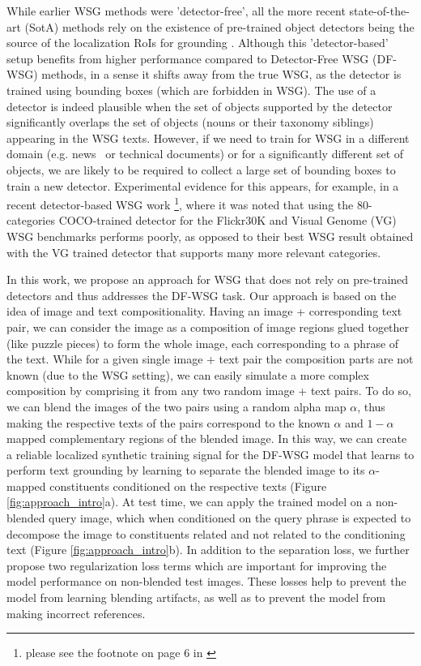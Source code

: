 \documentclass[10pt,twocolumn,letterpaper]{article}
\def\ourstask{DF-WSG}
\def\ourstaskfull{Detector-Free WSG }
\begin{document}
While earlier WSG methods \cite{akbari2019multi, javed2018learning, xiao2017weakly, zhang2018top} were 'detector-free', all the more recent state-of-the-art (SotA) methods rely on the existence of pre-trained object detectors being the source of the localization RoIs for grounding \cite{datta2019align2ground,gupta2020contrastive,wang2019phrase,chen2020counterfactual,chen2020uniter,lu202012}. Although this 'detector-based' setup benefits from higher performance compared to \ourstaskfull (\ourstask) methods, in a sense it shifts away from the true WSG, as the detector is trained using bounding boxes (which are forbidden in WSG). The use of a detector is indeed plausible when the set of objects supported by the detector significantly overlaps the set of objects (nouns or their taxonomy siblings) appearing in the WSG texts. However, if we need to train for WSG in a different domain (e.g. news~\cite{liu2020visualnews} or technical documents) or for a significantly different set of objects, we are likely to be required to collect a large set of bounding boxes to train a new detector. Experimental evidence for this appears, for example, in a recent detector-based WSG work \cite{datta2019align2ground}\footnote{please see the footnote on page 6 in \cite{datta2019align2ground}}, where it was noted that using the $80$-categories COCO-trained detector for the Flickr30K and Visual Genome (VG) WSG benchmarks performs poorly, as opposed to their best WSG result obtained with the VG trained detector that supports many more relevant categories. 

In this work, we propose an approach for WSG that does not rely on pre-trained detectors and thus addresses the \ourstask{} task. Our approach is based on the idea of image and text compositionality. Having an image + corresponding text pair, we can consider the image as a composition of image regions glued together (like puzzle pieces) to form the whole image, each corresponding to a phrase of the text.
While for a given single image + text pair the composition parts are not known (due to the WSG setting), we can easily simulate a more complex composition by comprising it from any two random image + text pairs. To do so, we can blend the images of the two pairs using a random alpha map $\alpha$, thus making the respective texts of the pairs correspond to the known $\alpha$ and $1 - \alpha$ mapped complementary regions of the blended image. In this way, we can create a reliable localized synthetic training signal for the \ourstask{} model that learns to perform text grounding by learning to separate the blended image to its $\alpha$-mapped constituents conditioned on the respective texts (Figure \ref{fig:approach_intro}a). 
At test time, we can apply the trained model on a non-blended query image, which when conditioned on the query phrase is expected to decompose the image to constituents related and not related to the conditioning text (Figure \ref{fig:approach_intro}b).
In addition to the separation loss, we further propose two regularization loss terms which are important for improving the model performance on non-blended test images. These losses help to prevent the model from learning blending artifacts, as well as to prevent the model from making incorrect references.
\end{document}

